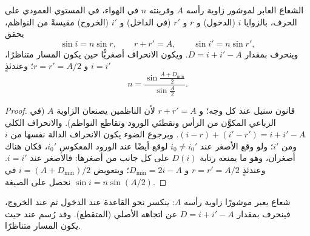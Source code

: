 \begin{proposition}\label{prop:b1:rays-reflection-refraction:prism}
الشعاع العابر لموشور زاوية رأسه $A$ وقرينته $n$ في الهواء، في المستوي
العمودي على الحرف، بالزوايا $i$ (الدخول) و $r$ و $r'$
(في الداخل) و $i'$ (الخروج) مقيسةً من النواظم، يحقق
\[
\sin i = n \sin r, \qquad r + r' = A, \qquad \sin i' = n \sin r',
\]
وينحرف بمقدار $D = i + i' - A$. ويكون الانحراف أصغريًّا حين يكون
المسار متناظرًا، $i = i'$ و $r = r' = A/2$؛ وعندئذٍ
\[
n = \frac{\sin\frac{A + D_{\min}}{2}}{\sin\frac{A}{2}} .
\]
\end{proposition}

\begin{proof}
قانون سنيل عند كل وجه؛ و $r + r' = A$ لأن الناظمين يصنعان
الزاوية $A$ (في الرباعي المكوَّن من الرأس ونقطتَي الورود وتقاطع
النواظم). والانحراف الكلي
$(i - r) + (i' - r') = i + i' - A$. وبرجوع الضوء يكون الانحراف الدالة
نفسها من $i$ ومن $i'$؛ ولو وقع الأصغر عند $i_0 \neq i_0'$ لوقع أيضًا
عند الورود المعكوس $i_0'$، فكان هناك أصغران، وهو ما يمنعه رتابة
$D(i)$ على كل جانب من أصغرها: فالأصغر عند $i = i'$.
وعندئذٍ $r = r' = A/2$ و $D_{\min} = 2i - A$؛ وبتعويض $i = (A +
D_{\min})/2$ في $\sin i = n\sin(A/2)$ نحصل على الصيغة.
\end{proof}

\begin{omfigure}

{\small شعاع يعبر موشورًا زاوية رأسه $A$: ينكسر نحو القاعدة عند
الدخول ثم عند الخروج، فينحرف بمقدار $D = i + i' - A$
عن اتجاهه الأصلي (المتقطع). وقد رُسم عند  حيث يكون
المسار متناظرًا.}
\end{omfigure}

